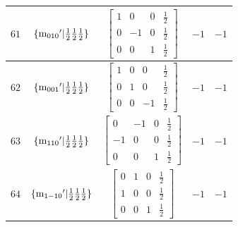 \documentclass[fleqn,8pt]{jsarticle}
\begin{document}
\begin{longtable}{ccccc}
$ 61 $ & $ \{{\rm m}_{010}{}'|\frac{1}{2} \frac{1}{2} \frac{1}{2}\} $ & $ \begin{bmatrix} 1 & 0 & 0 & \frac{1}{2} \\ 0 & -1 & 0 & \frac{1}{2} \\ 0 & 0 & 1 & \frac{1}{2} \end{bmatrix} $ & $ -1 $ & $ -1 $ \\ \hline
$ 62 $ & $ \{{\rm m}_{001}{}'|\frac{1}{2} \frac{1}{2} \frac{1}{2}\} $ & $ \begin{bmatrix} 1 & 0 & 0 & \frac{1}{2} \\ 0 & 1 & 0 & \frac{1}{2} \\ 0 & 0 & -1 & \frac{1}{2} \end{bmatrix} $ & $ -1 $ & $ -1 $ \\ \hline
$ 63 $ & $ \{{\rm m}_{110}{}'|\frac{1}{2} \frac{1}{2} \frac{1}{2}\} $ & $ \begin{bmatrix} 0 & -1 & 0 & \frac{1}{2} \\ -1 & 0 & 0 & \frac{1}{2} \\ 0 & 0 & 1 & \frac{1}{2} \end{bmatrix} $ & $ -1 $ & $ -1 $ \\ \hline
$ 64 $ & $ \{{\rm m}_{1-10}{}'|\frac{1}{2} \frac{1}{2} \frac{1}{2}\} $ & $ \begin{bmatrix} 0 & 1 & 0 & \frac{1}{2} \\ 1 & 0 & 0 & \frac{1}{2} \\ 0 & 0 & 1 & \frac{1}{2} \end{bmatrix} $ & $ -1 $ & $ -1 $ \\
\end{longtable}
\end{document}
